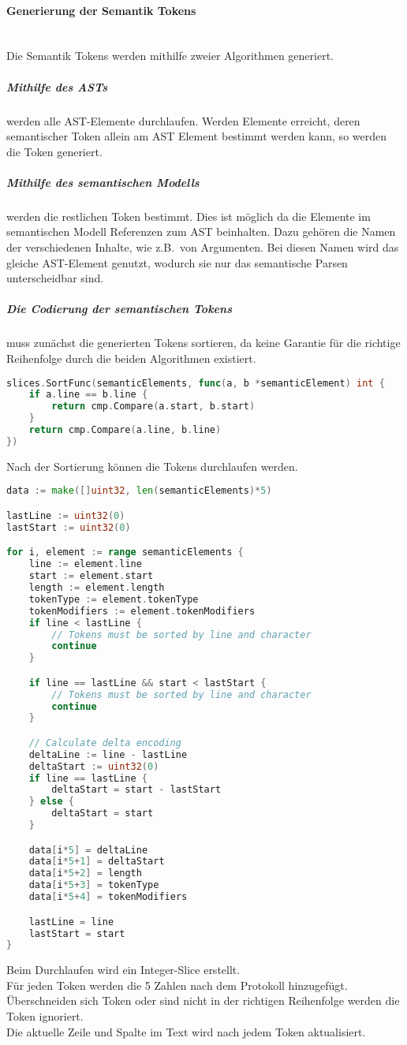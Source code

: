 \documentclass[./einleitung.tex]{subfiles}
\begin{document}
    \paragraph{Generierung der Semantik Tokens}\mbox{}\\
    Die Semantik Tokens werden mithilfe zweier Algorithmen generiert.
    \subparagraph{Mithilfe des ASTs} werden alle AST-Elemente durchlaufen.
    Werden Elemente erreicht, deren semantischer Token allein am AST Element bestimmt werden kann, so werden die Token generiert.
    \subparagraph{Mithilfe des semantischen Modells} werden die restlichen Token bestimmt.
    Dies ist möglich da die Elemente im semantischen Modell Referenzen zum AST beinhalten.
    Dazu gehören die Namen der verschiedenen Inhalte, wie z.B.\ von Argumenten.
    Bei diesen Namen wird das gleiche AST-Element genutzt, wodurch sie nur das semantische Parsen unterscheidbar sind.

    \subparagraph{Die Codierung der semantischen Tokens} muss zunächst die generierten Tokens sortieren, da keine Garantie für die richtige Reihenfolge durch die beiden Algorithmen existiert.
    \begin{lstlisting}[language=Go,label={lst:sortSemanticTokens}]
slices.SortFunc(semanticElements, func(a, b *semanticElement) int {
    if a.line == b.line {
        return cmp.Compare(a.start, b.start)
    }
    return cmp.Compare(a.line, b.line)
})
    \end{lstlisting}
    Nach der Sortierung können die Tokens durchlaufen werden.
    \begin{lstlisting}[language=Go]
data := make([]uint32, len(semanticElements)*5)

lastLine := uint32(0)
lastStart := uint32(0)

for i, element := range semanticElements {
    line := element.line
    start := element.start
    length := element.length
    tokenType := element.tokenType
    tokenModifiers := element.tokenModifiers
    if line < lastLine {
        // Tokens must be sorted by line and character
        continue
    }

    if line == lastLine && start < lastStart {
        // Tokens must be sorted by line and character
        continue
    }

    // Calculate delta encoding
    deltaLine := line - lastLine
    deltaStart := uint32(0)
    if line == lastLine {
        deltaStart = start - lastStart
    } else {
        deltaStart = start
    }

    data[i*5] = deltaLine
    data[i*5+1] = deltaStart
    data[i*5+2] = length
    data[i*5+3] = tokenType
    data[i*5+4] = tokenModifiers

    lastLine = line
    lastStart = start
}
    \end{lstlisting}
    Beim Durchlaufen wird ein Integer-Slice erstellt. \\
    Für jeden Token werden die 5 Zahlen nach dem Protokoll hinzugefügt. \\
    Überschneiden sich Token oder sind nicht in der richtigen Reihenfolge werden die Token ignoriert. \\
    Die aktuelle Zeile und Spalte im Text wird nach jedem Token aktualisiert.
\end{document}
